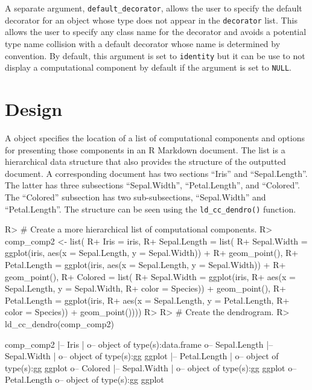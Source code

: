 \documentclass[
]{jss}
\begin{document}
A separate argument, \texttt{default\_decorator}, allows the user to
specify the default decorator for an object whose type does not appear
in the \texttt{decorator} list. This allows the user to specify any
class name for the decorator and avoids a potential type name collision
with a default decorator whose name is determined by convention. By
default, this argument is set to \texttt{identity} but it can be use to
not display a computational component by default if the argument is set
to \texttt{NULL}.

\hypertarget{design}{%
\section{Design}\label{design}}

A  object specifies the location of a list of
computational components and options for presenting those components in
an R Markdown document. The list is a hierarchical data structure that
also provides the structure of the outputted document. A corresponding
document has two sections ``Iris'' and ``Sepal.Length''. The latter has
three subsections ``Sepal.Width'', ``Petal.Length'', and ``Colored''.
The ``Colored'' subsection has two sub-subsections, ``Sepal.Width'' and
``Petal.Length''. The structure can be seen using the
\texttt{ld\_cc\_dendro()} function.

\begin{CodeChunk}

\begin{CodeInput}
R> # Create a more hierarchical list of computational components.
R> comp_comp2 <- list(
R+   Iris = iris,
R+   Sepal.Length = list(
R+     Sepal.Width = ggplot(iris, aes(x = Sepal.Length, y = Sepal.Width)) + 
R+       geom_point(),
R+     Petal.Length = ggplot(iris, aes(x = Sepal.Length, y = Sepal.Width)) + 
R+       geom_point(),
R+     Colored = list(
R+       Sepal.Width = ggplot(iris, 
R+                           aes(x = Sepal.Length, y = Sepal.Width, 
R+                               color = Species)) + geom_point(),
R+       Petal.Length = ggplot(iris,
R+                             aes(x = Sepal.Length, y = Petal.Length, 
R+                                 color = Species)) + geom_point())))
R> 
R> # Create the dendrogram.
R> ld_cc_dendro(comp_comp2)
\end{CodeInput}

\begin{CodeOutput}

comp_comp2
  |-- Iris
  |  o-- object of type(s):data.frame
  o-- Sepal.Length
   |-- Sepal.Width
   |  o-- object of type(s):gg ggplot
   |-- Petal.Length
   |  o-- object of type(s):gg ggplot
   o-- Colored
    |-- Sepal.Width
    |  o-- object of type(s):gg ggplot
    o-- Petal.Length
       o-- object of type(s):gg ggplot
\end{CodeOutput}
\end{CodeChunk}
\end{document}
